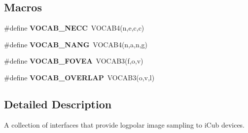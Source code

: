 \subsection*{Macros}
\begin{DoxyCompactItemize}
\item 
\#define {\bfseries V\+O\+C\+A\+B\+\_\+\+N\+E\+C\+C}~V\+O\+C\+A\+B4(\textquotesingle{}n\textquotesingle{},\textquotesingle{}e\textquotesingle{},\textquotesingle{}c\textquotesingle{},\textquotesingle{}c\textquotesingle{})\label{LogpolarInterfaces_8h_ac6aa6d93f41e41b73a02b864041f1127}

\item 
\#define {\bfseries V\+O\+C\+A\+B\+\_\+\+N\+A\+N\+G}~V\+O\+C\+A\+B4(\textquotesingle{}n\textquotesingle{},\textquotesingle{}a\textquotesingle{},\textquotesingle{}n\textquotesingle{},\textquotesingle{}g\textquotesingle{})\label{LogpolarInterfaces_8h_a1384301f6c9be5a84d6b6f9b23bbb307}

\item 
\#define {\bfseries V\+O\+C\+A\+B\+\_\+\+F\+O\+V\+E\+A}~V\+O\+C\+A\+B3(\textquotesingle{}f\textquotesingle{},\textquotesingle{}o\textquotesingle{},\textquotesingle{}v\textquotesingle{})\label{LogpolarInterfaces_8h_aad25dc5ee8c486dfe67c3d72f9f985e2}

\item 
\#define {\bfseries V\+O\+C\+A\+B\+\_\+\+O\+V\+E\+R\+L\+A\+P}~V\+O\+C\+A\+B3(\textquotesingle{}o\textquotesingle{},\textquotesingle{}v\textquotesingle{},\textquotesingle{}l\textquotesingle{})\label{LogpolarInterfaces_8h_aaa189669533d67493193ac8886b76e7c}

\end{DoxyCompactItemize}


\subsection{Detailed Description}
A collection of interfaces that provide logpolar image sampling to i\+Cub devices. 

